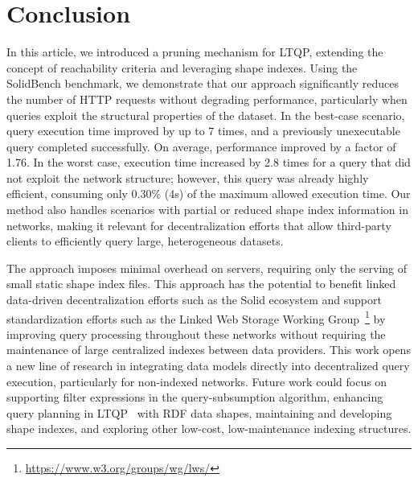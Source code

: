 \section{Conclusion}\label{sec:conclusion}

In this article, we introduced a pruning mechanism for LTQP, extending the concept of reachability criteria and leveraging shape indexes. 
Using the SolidBench benchmark, we demonstrate that our approach significantly reduces the number of HTTP requests without degrading performance, particularly when queries exploit the structural properties of the dataset.
In the best-case scenario, query execution time improved by up to 7 times, and a previously unexecutable query completed successfully.
On average, performance improved by a factor of 1.76.
In the worst case, execution time increased by 2.8 times for a query that did not exploit the network structure; however, this query was already highly efficient, consuming only 0.30\% (4s) of the maximum allowed execution time.
Our method also handles scenarios with partial or reduced shape index information in networks, making it relevant for decentralization efforts that allow third-party clients to efficiently query large, heterogeneous datasets.

The approach imposes minimal overhead on servers, requiring only the serving of small static shape index files. 
This approach has the potential to benefit linked data-driven decentralization efforts such as the Solid ecosystem and support standardization efforts such as the Linked Web Storage Working Group~\footnote{\url{https://www.w3.org/groups/wg/lws/}} by improving query processing throughout these networks without requiring the maintenance of large centralized indexes between data providers.
This work opens a new line of research in integrating data models directly into decentralized query execution, particularly for non-indexed networks. 
Future work could focus on supporting filter expressions in the query-subsumption algorithm, enhancing query planning in LTQP~\cite{taelman2024towards} with RDF data shapes, 
maintaining and developing shape indexes, and exploring other low-cost, low-maintenance indexing structures.



